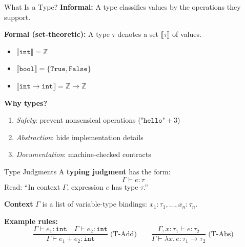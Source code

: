 \documentclass[aspectratio=169,10pt]{beamer}
\providecommand{\llbracket}{\lBrack}
\providecommand{\rrbracket}{\rBrack}
\begin{document}
\begin{frame}{What Is a Type?}
\textbf{Informal:} A type classifies values by the operations they support.

\vspace{0.5em}
\textbf{Formal (set-theoretic):} A type $\tau$ denotes a set $\llbracket \tau \rrbracket$ of values.
\begin{itemize}
  \item $\llbracket \texttt{int} \rrbracket = \mathbb{Z}$
  \item $\llbracket \texttt{bool} \rrbracket = \{\texttt{True}, \texttt{False}\}$
  \item $\llbracket \texttt{int} \to \texttt{int} \rrbracket = \mathbb{Z} \to \mathbb{Z}$
\end{itemize}

\vspace{0.5em}
\textbf{Why types?}
\begin{enumerate}
  \item \emph{Safety}: prevent nonsensical operations ($\texttt{"hello"} + 3$)
  \item \emph{Abstraction}: hide implementation details
  \item \emph{Documentation}: machine-checked contracts
\end{enumerate}
\end{frame}

\begin{frame}{Type Judgments}
A \textbf{typing judgment} has the form:
\[
\Gamma \vdash e : \tau
\]
Read: ``In context $\Gamma$, expression $e$ has type $\tau$.''

\vspace{0.3em}
\textbf{Context} $\Gamma$ is a list of variable-type bindings: $x_1:\tau_1, \ldots, x_n:\tau_n$.

\vspace{0.3em}
\textbf{Example rules:}
\[
\frac{\Gamma \vdash e_1 : \texttt{int} \quad \Gamma \vdash e_2 : \texttt{int}}
     {\Gamma \vdash e_1 + e_2 : \texttt{int}} \;\text{(T-Add)}
\qquad
\frac{\Gamma, x:\tau_1 \vdash e : \tau_2}
     {\Gamma \vdash \lambda x.\, e : \tau_1 \to \tau_2} \;\text{(T-Abs)}
\]
\end{frame}
\end{document}
